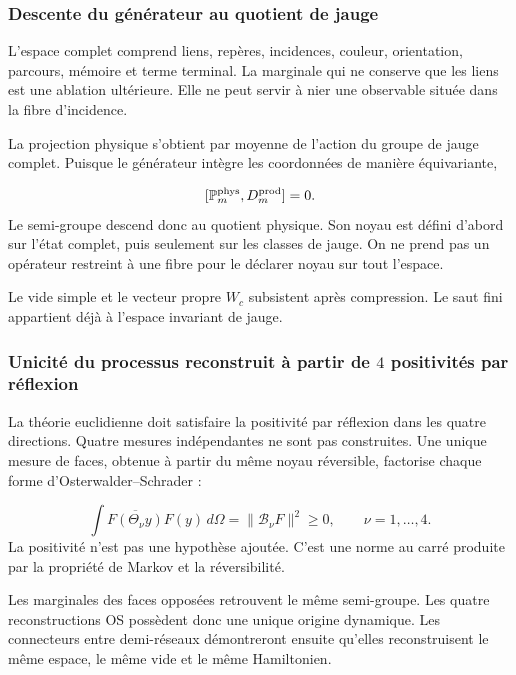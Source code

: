 \subsubsection{Descente du générateur au quotient de jauge}
L’espace complet comprend liens, repères, incidences, couleur, orientation, parcours, mémoire et terme terminal. La marginale qui ne conserve que les liens est une ablation ultérieure. Elle ne peut servir à nier une observable située dans la fibre d’incidence.\par
La projection physique s’obtient par moyenne de l’action du groupe de jauge complet. Puisque le générateur intègre les coordonnées de manière équivariante,\par
\[
[\mathbb P_m^{\rm phys},D_m^{\rm prod}]=0.
\]
Le semi-groupe descend donc au quotient physique. Son noyau est défini d’abord sur l’état complet, puis seulement sur les classes de jauge. On ne prend pas un opérateur restreint à une fibre pour le déclarer noyau sur tout l’espace.\par
Le vide simple et le vecteur propre \(W_c\) subsistent après compression. Le saut fini appartient déjà à l’espace invariant de jauge.\par
{}
\subsubsection{Unicité du processus reconstruit à partir de \(4\) positivités par réflexion}
La théorie euclidienne doit satisfaire la positivité par réflexion dans les quatre directions. Quatre mesures indépendantes ne sont pas construites. Une unique mesure de faces, obtenue à partir du même noyau réversible, factorise chaque forme d’Osterwalder–Schrader :\par
\[
\int
\overline{F(\Theta_{\nu}y)}F(y)\,d\Omega
=
\|\mathcal B_\nu F\|^2
\ge0,
\qquad \nu=1,\ldots,4.
\]
La positivité n’est pas une hypothèse ajoutée. C’est une norme au carré produite par la propriété de Markov et la réversibilité.\par
Les marginales des faces opposées retrouvent le même semi-groupe. Les quatre reconstructions OS possèdent donc une unique origine dynamique. Les connecteurs entre demi-réseaux démontreront ensuite qu’elles reconstruisent le même espace, le même vide et le même Hamiltonien.\par
{}
